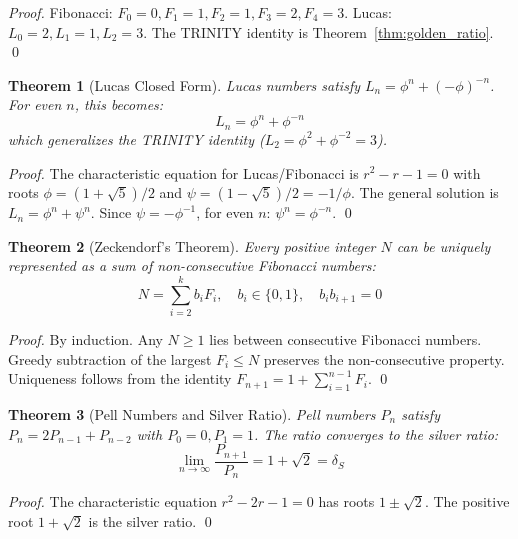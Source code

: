 \documentclass[aps,prd,preprint,superscriptaddress,showpacs,nofootinbib,longbibliography]{revtex4-2}
\newtheorem{theorem}{Theorem}
\begin{document}
\begin{proof}
Fibonacci: $F_0=0, F_1=1, F_2=1, F_3=2, F_4=3$. Lucas: $L_0=2, L_1=1, L_2=3$. The TRINITY identity is Theorem~\ref{thm:golden_ratio}. \qed
\end{proof}

\begin{theorem}[Lucas Closed Form]
\label{thm:lucas_closed}
Lucas numbers satisfy $L_n = \phi^n + (-\phi)^{-n}$. For even $n$, this becomes:
\begin{equation}
L_n = \phi^n + \phi^{-n}
\end{equation}
which generalizes the TRINITY identity ($L_2 = \phi^2 + \phi^{-2} = 3$).
\end{theorem}

\begin{proof}
The characteristic equation for Lucas/Fibonacci is $r^2 - r - 1 = 0$ with roots $\phi = (1+\sqrt{5})/2$ and $\psi = (1-\sqrt{5})/2 = -1/\phi$. The general solution is $L_n = \phi^n + \psi^n$. Since $\psi = -\phi^{-1}$, for even $n$: $\psi^n = \phi^{-n}$. \qed
\end{proof}

\begin{theorem}[Zeckendorf's Theorem]
\label{thm:zeckendorf}
Every positive integer $N$ can be uniquely represented as a sum of non-consecutive Fibonacci numbers:
\begin{equation}
N = \sum_{i=2}^{k} b_i F_i, \quad b_i \in \{0, 1\}, \quad b_i b_{i+1} = 0
\end{equation}
\end{theorem}

\begin{proof}
By induction. Any $N \geq 1$ lies between consecutive Fibonacci numbers. Greedy subtraction of the largest $F_i \leq N$ preserves the non-consecutive property. Uniqueness follows from the identity $F_{n+1} = 1 + \sum_{i=1}^{n-1} F_i$. \qed
\end{proof}

\begin{theorem}[Pell Numbers and Silver Ratio]
\label{thm:pell}
Pell numbers $P_n$ satisfy $P_n = 2P_{n-1} + P_{n-2}$ with $P_0 = 0, P_1 = 1$. The ratio converges to the silver ratio:
\begin{equation}
\lim_{n \to \infty} \frac{P_{n+1}}{P_n} = 1 + \sqrt{2} = \delta_S
\end{equation}
\end{theorem}

\begin{proof}
The characteristic equation $r^2 - 2r - 1 = 0$ has roots $1 \pm \sqrt{2}$. The positive root $1 + \sqrt{2}$ is the silver ratio. \qed
\end{proof}
\end{document}
